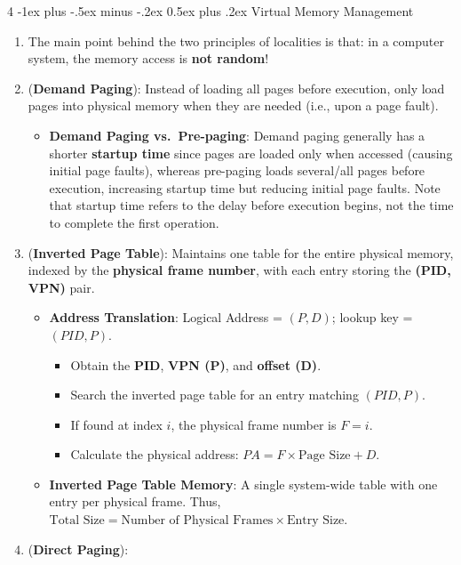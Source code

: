 \documentclass[10pt, landscape]{article}
\makeatletter
\renewcommand{\section}{\@startsection{section}{1}{0mm}%
                                {-1ex plus -.5ex minus -.2ex}%
                                {0.5ex plus .2ex}%
                                {\normalfont\large\bfseries}}
\makeatother
\begin{document}
\begin{multicols}{4}
\section{Virtual Memory Management}
\begin{enumerate}
    \item The main point behind the two principles of localities is that: in a computer system, the memory access is \textbf{not random}!
    \item (\textbf{Demand Paging}): Instead of loading all pages before execution, only load pages into physical memory when they are needed (i.e., upon a page fault).
    \begin{itemize}
        \item \textbf{Demand Paging vs.\ Pre-paging}: Demand paging generally has a shorter \textbf{startup time} since pages are loaded only when accessed (causing initial page faults), whereas pre-paging loads several/all pages before execution, increasing startup time but reducing initial page faults. Note that startup time refers to the delay before execution begins, not the time to complete the first operation.
    \end{itemize}
    \item (\textbf{Inverted Page Table}): Maintains one table for the entire physical memory, indexed by the \textbf{physical frame number}, with each entry storing the \textbf{(PID, VPN)} pair.
    \begin{itemize}
        \item \textbf{Address Translation}: Logical Address = $(P,D)$; lookup key = $(PID,P)$.
        \begin{itemize}
            \item Obtain the \textbf{PID}, \textbf{VPN (P)}, and \textbf{offset (D)}.
            \item Search the inverted page table for an entry matching $(PID, P)$.
            \item If found at index $i$, the physical frame number is $F=i$.
            \item Calculate the physical address: $PA = F \times \text{Page Size} + D$.
        \end{itemize}
        \item \textbf{Inverted Page Table Memory}: A single system-wide table with one entry per physical frame. Thus, $\text{Total Size} = \text{Number of Physical Frames} \times \text{Entry Size}$.
    \end{itemize}
    \item (\textbf{Direct Paging}): 

\end{enumerate}
\end{multicols}
\end{document}
